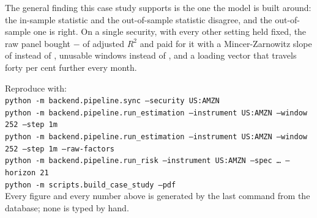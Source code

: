 \documentclass[11pt,a4paper]{article}
\newcommand{\code}[1]{\texttt{\small #1}}
\begin{document}
The general finding this case study supports is the one the model is built around:
the in-sample statistic and the out-of-sample statistic disagree, and the
out-of-sample one is right. On a single security, with every other setting held
fixed, the raw panel bought \adjRR{}$-$\adjRO{} of adjusted $R^2$ and paid for it
with a Mincer-Zarnowitz slope of \mzbR{} instead of \mzbO{}, \exclR{} unusable
windows instead of \exclO{}, and a loading vector that travels
forty per cent further every month.

\vspace{1.2ex}
{\footnotesize\color{ink}
Reproduce with:\\[0.4ex]
\code{python -m backend.pipeline.sync --security US:AMZN}\\
\code{python -m backend.pipeline.run\_estimation --instrument US:AMZN --window 252 --step 1m}\\
\code{python -m backend.pipeline.run\_estimation --instrument US:AMZN --window 252 --step 1m --raw-factors}\\
\code{python -m backend.pipeline.run\_risk --instrument US:AMZN --spec \orthSpec\ldots{} --horizon 21}\\
\code{python -m scripts.build\_case\_study --pdf}\\[0.6ex]
Every figure and every number above is generated by the last command from the
database; none is typed by hand.\par}
\end{document}
